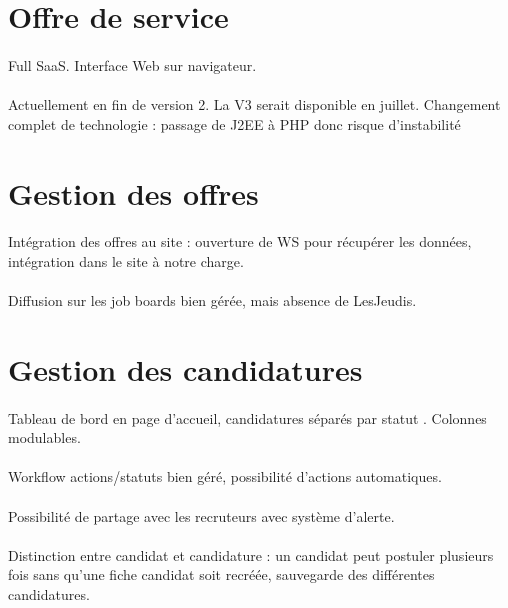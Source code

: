 \documentclass[12pt,twoside]{scrreprt}
\begin{document}
\section{Offre de service}
\paragraph{} Full SaaS. Interface Web sur navigateur.
\paragraph{} Actuellement en fin de version 2. La V3 serait disponible en juillet. Changement complet de technologie : passage de J2EE à PHP donc risque d'instabilité


\section{Gestion des offres}

\paragraph{} Intégration des offres au site : ouverture de WS pour récupérer les données, intégration dans le site à notre charge.
\paragraph{} Diffusion sur les job boards bien gérée, mais absence de LesJeudis.

\section{Gestion des candidatures}
\paragraph{} Tableau de bord en page d'accueil, candidatures séparés par statut . Colonnes modulables.
\paragraph{} Workflow actions/statuts bien géré, possibilité d'actions automatiques.
\paragraph{} Possibilité de partage avec les recruteurs avec système d'alerte.
\paragraph{} Distinction entre candidat et candidature : un candidat peut postuler plusieurs fois sans qu'une fiche candidat soit recréée, sauvegarde des différentes candidatures.
\end{document}
